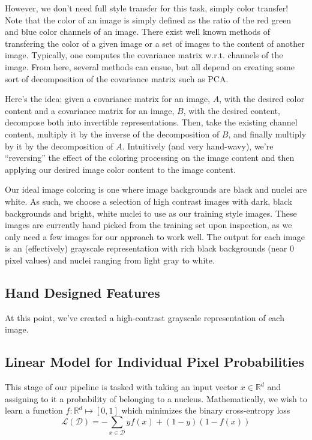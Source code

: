 \documentclass[paper=letter, fontsize=12pt]{article}
\numberwithin{equation}{section} %
\numberwithin{figure}{section} %
\numberwithin{table}{section} %
\begin{document}
However, we don't need full style transfer for this task, simply color
transfer! Note that the color of an image is simply defined as the ratio of the
red green and blue color channels of an image. There exist well known methods
of transfering the color of a given image or a set of images to the content of
another image.  Typically, one computes the covariance matrix w.r.t. channels
of the image.  From here, several methods can ensue, but all depend on creating
some sort of decomposition of the covariance matrix such as PCA.

Here's the idea: given a covariance matrix for an image, $A$, with the desired
color content and a covariance matrix for an image, $B$, with the desired
content, decompose both into invertible representations. Then, take the
existing channel content, multiply it by the inverse of the decomposition of
$B$, and finally multiply by it by the decomposition of $A$. Intuitively (and
very hand-wavy), we're ``reversing'' the effect of the coloring processing on
the image content and then applying our desired image color content to the
image content.

Our ideal image coloring is one where image backgrounds are black and nuclei
are white.  As such, we choose a selection of high contrast images with dark,
black backgrounds and bright, white nuclei to use as our training style images.
These images are currently hand picked from the training set upon inspection,
as we only need a few images for our approach to work well.  The output for
each image is an (effectively) grayscale representation with rich black
backgrounds (near 0 pixel values) and nuclei ranging from light gray to white.

\subsection{Hand Designed Features}

At this point, we've created a high-contrast grayscale representation of each
image.

\subsection{Linear Model for Individual Pixel Probabilities}

This stage of our pipeline is tasked with taking an input vector $x \in
\mathbb{R}^d$ and assigning to it a probability of belonging to a nucleus.
Mathematically, we wish to learn a function $f: \mathbb{R}^d \mapsto [0, 1]$
which minimizes the binary cross-entropy loss
\begin{equation}
    \mathcal{L}(\mathcal{D}) = 
        - \sum_{x \in \mathcal{D}} yf(x) + (1 - y)(1 - f(x))
\end{equation}
\end{document}
